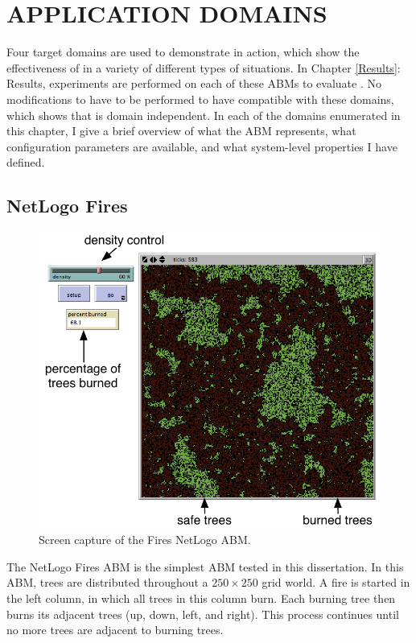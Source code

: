 \chapter{APPLICATION DOMAINS}
\thispagestyle{plain}

\label{Domains}


Four target domains are used to demonstrate \fw in action, which show the effectiveness of \fw in a variety of different types of situations.
In Chapter \ref{Results}: Results, experiments are performed on each of these ABMs to evaluate \fw.
No modifications to \fw have to be performed to have \fw compatible with these domains, which shows that \fw is domain independent.
In each of the domains enumerated in this chapter, I give a brief overview of what the ABM represents, what configuration parameters are available, and what system-level properties I have defined.

\section{NetLogo Fires}\label{sec:Fires}

\begin{figure}[ht]
\centering
\includegraphics[scale=1]{images/fires_ui.pdf}
\caption{Screen capture of the Fires NetLogo ABM.}
\label{fig:firesui}
\end{figure}

The NetLogo Fires ABM is the simplest ABM tested in this dissertation.
In this ABM, trees are distributed throughout a $250 \times 250$ grid world.
A fire is started in the left column, in which all trees in this column burn.
Each burning tree then burns its adjacent trees (up, down, left, and right).
This process continues until no more trees are adjacent to burning trees.

